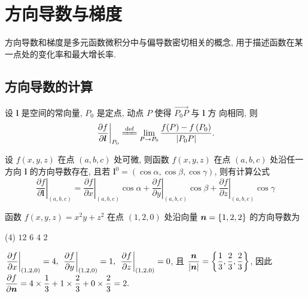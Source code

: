 \section{方向导数与梯度}

方向导数和梯度是多元函数微积分中与偏导数密切相关的概念, 用于描述函数在某一点处的变化率和最大增长率.

\subsection{方向导数的计算}

\begin{definition}[方向导数]
    设 $ \boldsymbol{l} $ 是空间的常向量, $P_{0} $ 是定点, 动点 $ P $ 使得 $ \overrightarrow{P_{0} P} $ 与 $ \boldsymbol{l} $ 方 向相同, 则
    $$\left.\frac{\partial f}{\partial \boldsymbol{\boldsymbol{l}}}\right|_{P_{0}} \xlongequal[]{\text{def}} \lim _{P \rightarrow P_{0}} \frac{f(P)-f\left(P_{0}\right)}{\left|P_{0} P\right|}.$$
\end{definition}

\begin{theorem}[方向导数的计算]
    设 $ f(x, y, z) $ 在点 $ (a, b, c) $ 处可微, 则函数 $ f(x, y, z) $ 在点 $ (a, b, c) $ 处沿任一方向 $ \boldsymbol{l} $ 的方向导数存在, 
    且若 $ \boldsymbol{l}^{0}=(\cos \alpha, \cos \beta, \cos \gamma) $, 则有计算公式
    $$\left.\frac{\partial f}{\partial\boldsymbol{l}}\right|_{(a, b, c)}=\left.\frac{\partial f}{\partial x}\right|_{(a, b, c)} \cos \alpha+\left.\frac{\partial f}{\partial y}\right|_{(a, b, c)} \cos \beta+\left.\frac{\partial f}{\partial z}\right|_{(a, b, c)} \cos \gamma$$
\end{theorem}

\begin{example}[2017 数一]
    函数 $f(x,y,z)=x^2y+z^2$ 在点 $(1,2,0)$ 处沿向量 $\vb*{n}=\qty{1,2,2}$ 的方向导数为 
    \begin{tasks}(4)
        \task $12$
        \task $6$
        \task $4$
        \task $2$
    \end{tasks}
\end{example}
\begin{solution}
    $\displaystyle \eval{\pdv{f}{x}}_{(1,2,0)}=4,~\eval{\pdv{f}{y}}_{(1,2,0)}=1,~\eval{\pdv{f}{z}}_{(1,2,0)}=0$, 且 $\dfrac{\vb*{n}}{|\vb*{n}|}=\qty{\dfrac{1}{3},\dfrac{2}{3},\dfrac{2}{3}}$, 
    因此 $\displaystyle\pdv{f}{\vb*{n}}=4\times\dfrac{1}{3}+1\times\dfrac{2}{3}+0\times\dfrac{2}{3}=2.$
\end{solution}

